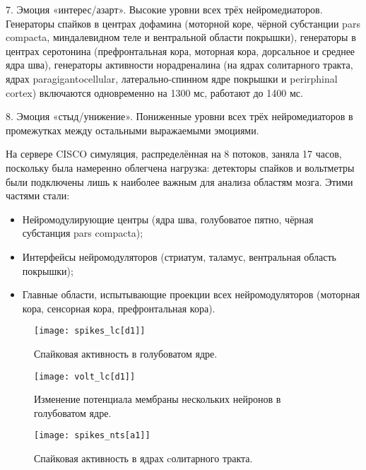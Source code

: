 7. Эмоция «интерес/азарт». Высокие уровни всех трёх нейромедиаторов. Генераторы спайков в центрах дофамина (моторной коре, чёрной субстанции pars compacta, миндалевидном теле и вентральной области покрышки), генераторы в центрах серотонина (префронтальная кора, моторная кора, дорсальное и среднее ядра шва), генераторы активности норадреналина (на ядрах солитарного тракта, ядрах paragigantocellular, латерально-спинном ядре покрышки и perirphinal cortex) включаются одновременно на 1300 мс, работают до 1400 мс.


8. Эмоция «стыд/унижение». Пониженные уровни всех трёх нейромедиаторов в промежутках между остальными выражаемыми эмоциями.


На сервере CISCO симуляция, распределённая на 8 потоков, заняла 17 часов, поскольку была намеренно облегчена нагрузка: детекторы спайков и вольтметры были подключены лишь к наиболее важным для анализа областям мозга. Этими частями стали: \begin{itemize}
\item Нейромодулирующие центры (ядра шва, голубоватое пятно, чёрная субстанция pars compacta);
\item Интерфейсы нейромодуляторов (стриатум, таламус, вентральная область покрышки);
\item Главные области, испытывающие проекции всех нейромодуляторов (моторная кора, сенсорная кора, префронтальная кора).
\end{itemize}



\begin{figure}
	\centering
	\texttt{[image: spikes\_lc[d1]]}
	\caption{Спайковая активность в голубоватом ядре.}
	\label{fig:spikes_lc}
\end{figure}

\begin{figure}
	\centering
	\texttt{[image: volt\_lc[d1]]}
	\caption{Изменение потенциала мембраны нескольких нейронов в голубоватом ядре.}
	\label{fig:volt_lc}
\end{figure}

\begin{figure}
	\centering
	\texttt{[image: spikes\_nts[a1]]}
	\caption{Спайковая активность в ядрах cолитарного тракта.}
	\label{fig:spikes_nts}
\end{figure}

